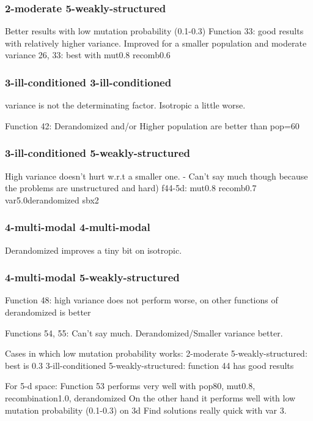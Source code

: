 \subsubsection*{2-moderate 5-weakly-structured}
Better results with low mutation probability (0.1-0.3)
Function 33: good results with relatively higher variance. Improved for a smaller population and moderate variance
26, 33: best with mut0.8 recomb0.6

\subsubsection*{3-ill-conditioned 3-ill-conditioned} 
variance is not the determinating factor. Isotropic a little worse.

Function 42: Derandomized and/or Higher population are better than pop=60

\subsubsection*{3-ill-conditioned 5-weakly-structured} 
High variance doesn't hurt w.r.t a smaller one. - 
Can't say much though because the problems are unstructured and hard)
f44-5d: mut0.8 recomb0.7 var5.0derandomized sbx2

\subsubsection*{4-multi-modal 4-multi-modal} 
Derandomized improves a tiny bit on isotropic.
\subsubsection*{4-multi-modal 5-weakly-structured}
 Function 48: high variance does not perform worse, on other functions of  derandomized is better
								    
Functions 54, 55: Can't say much. Derandomized/Smaller variance better.

Cases in which low mutation probability works:
2-moderate 5-weakly-structured: best is 0.3
3-ill-conditioned 5-weakly-structured: function 44 has good results

For 5-d space:
Function 53 performs very well with pop80, mut0.8, recombination1.0, derandomized
On the other hand it performs well with low mutation probability (0.1-0.3) on 3d
Find solutions really quick with var 3.
